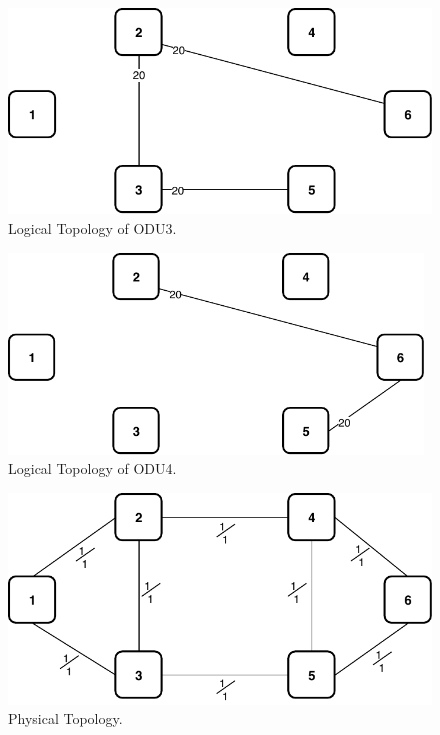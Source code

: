 \begin{figure}[h!]
\centering
\includegraphics[width=12cm]{sdf/ilp/opaque_protection/figures/logical_topology_ODU3_high}
\caption{Logical Topology of ODU3.}
\label{logical_ODU3_protectionhigh}
\end{figure}
\newpage
\begin{figure}[h!]
\centering
\includegraphics[width=11cm]{sdf/ilp/opaque_protection/figures/logical_topology_ODU4_high}
\caption{Logical Topology of ODU4.}
\label{logical_ODU4_protectionhigh}
\end{figure}

\begin{figure}[h!]
\centering
\includegraphics[width=12cm]{sdf/ilp/opaque_protection/figures/physical_topology}
\caption{Physical Topology.}
\label{physical_protectionhigh}
\end{figure}

